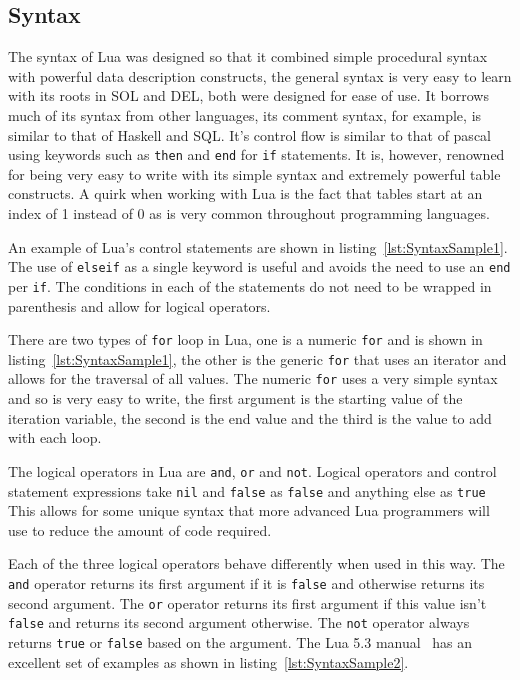 \documentclass[11pt,a4paper,titlepage]{report}
\begin{document}
\subsection{Syntax}
	The syntax of Lua was designed so that it combined simple procedural syntax with powerful data description constructs, the general syntax is very easy to learn with its roots in SOL and DEL, both were designed for ease of use. It borrows much of its syntax from other languages, its comment syntax, for example, is similar to that of Haskell and SQL. It's control flow is similar to that of pascal using keywords such as \texttt{then} and \texttt{end} for \texttt{if} statements. It is, however, renowned for being very easy to write with its simple syntax and extremely powerful table constructs. A quirk when working with Lua is the fact that tables start at an index of 1 instead of 0 as is very common throughout programming languages.

	An example of Lua's control statements are shown in listing~\ref{lst:SyntaxSample1}. The use of \texttt{elseif} as a single keyword is useful and avoids the need to use an \texttt{end} per \texttt{if}. The conditions in each of the statements do not need to be wrapped in parenthesis and allow for logical operators. 

	

	There are two types of \texttt{for} loop in Lua, one is a numeric \texttt{for} and is shown in listing~\ref{lst:SyntaxSample1}, the other is the generic \texttt{for} that uses an iterator and allows for the traversal of all values. The numeric \texttt{for} uses a very simple syntax and so is very easy to write, the first argument is the starting value of the iteration variable, the second is the end value and the third is the value to add with each loop.

	The logical operators in Lua are \texttt{and}, \texttt{or} and \texttt{not}. Logical operators and control statement expressions take \texttt{nil} and \texttt{false} as \texttt{false} and anything else as \texttt{true}~\cite{LuaMan} This allows for some unique syntax that more advanced Lua programmers will use to reduce the amount of code required.

	Each of the three logical operators behave differently when used in this way. The \texttt{and} operator returns its first argument if it is \texttt{false} and otherwise returns its second argument. The \texttt{or} operator returns its first argument if this value isn't \texttt{false} and returns its second argument otherwise. The \texttt{not} operator always returns \texttt{true} or \texttt{false} based on the argument. The Lua 5.3 manual~\cite{LuaMan} has an excellent set of examples as shown in listing~\ref{lst:SyntaxSample2}.
	
\end{document}
